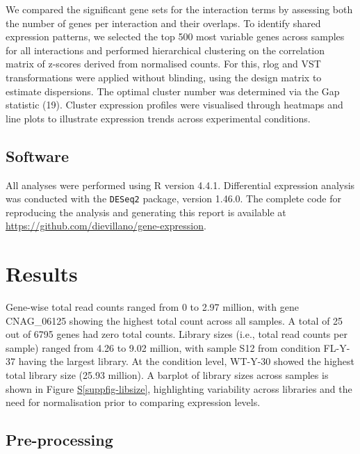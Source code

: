 \documentclass[
  a4paper,
]{scrreprt}
\newcommand*\quartosuppfigref[1]{Figure \hyperref[#1]{S\ref{#1}}}
\begin{document}
We compared the significant gene sets for the interaction terms by
assessing both the number of genes per interaction and their overlaps.
To identify shared expression patterns, we selected the top 500 most
variable genes across samples for all interactions and performed
hierarchical clustering on the correlation matrix of z-scores derived
from normalised counts. For this, rlog and VST transformations were
applied without blinding, using the design matrix to estimate
dispersions. The optimal cluster number was determined via the Gap
statistic (19). Cluster expression profiles were visualised through
heatmaps and line plots to illustrate expression trends across
experimental conditions.

\section{Software}\label{software}

All analyses were performed using R version 4.4.1. Differential
expression analysis was conducted with the \texttt{DESeq2} package,
version 1.46.0. The complete code for reproducing the analysis and
generating this report is available at
\url{https://github.com/dievillano/gene-expression}.


\chapter{Results}\label{sec-results}

Gene-wise total read counts ranged from 0 to 2.97 million, with gene
CNAG\_06125 showing the highest total count across all samples. A total
of 25 out of 6795 genes had zero total counts. Library sizes (i.e.,
total read counts per sample) ranged from 4.26 to 9.02 million, with
sample S12 from condition FL-Y-37 having the largest library. At the
condition level, WT-Y-30 showed the highest total library size (25.93
million). A barplot of library sizes across samples is shown in
\quartosuppfigref{suppfig-libsize}, highlighting variability across
libraries and the need for normalisation prior to comparing expression
levels.

\section{Pre-processing}\label{pre-processing}
\end{document}
